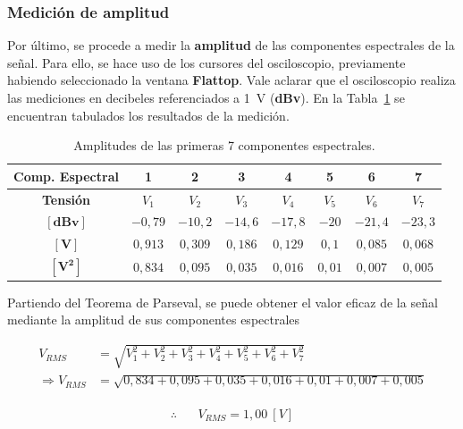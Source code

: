       
    \subsubsection{Medición de amplitud}
      Por último, se procede a medir la \textbf{amplitud} de las componentes espectrales de la señal. Para ello, se hace uso de los cursores
      del osciloscopio, previamente habiendo seleccionado la ventana \textbf{Flattop}. Vale aclarar que el osciloscopio realiza las mediciones
      en decibeles referenciados a 1~V (\textbf{dBv}). En la Tabla~\ref{tab:AmplitudEspectrExp1} se encuentran tabulados los resultados de la medición.

      \begin{table}[H]
        \centering
      \begin{tabular}{cccccccc} \hline \hline
        \textbf{Comp. Espectral}  &  \textbf{1}  &  \textbf{2}  & \textbf{3}  & \textbf{4} & \textbf{5}  & \textbf{6}  &  \textbf{7}\\ \hline
        \textbf{Tensión} &   $V_1$    &   $V_2$     &   $V_3$    &  $V_4$    &  $V_5$  &  $V_6$    &  $V_7$\\ \hline \hline
        $\mathbf{[dBv]}$ &   $-0,79$  &   $-10,2$   &   $-14,6$  &  $-17,8$  &  $-20$  &  $-21,4$  &  $-23,3$\\ \hline
        $\mathbf{[V]}$   &  $0,913$   &   $0,309$   & $0,186$    &  $0,129$  &  $0,1$  &  $0,085$  &  $0,068$ \\ \hline
        $\mathbf{[V^2]}$ &  $0,834$   &   $0,095$   & $0,035$    &  $0,016$  &  $0,01$ &  $0,007$  &  $0,005$ \\ \hline \hline
        \end{tabular}
        \caption{Amplitudes de las primeras 7 componentes espectrales.}
        \label{tab:AmplitudEspectrExp1}
      \end{table}

      Partiendo del Teorema de Parseval, se puede obtener el valor eficaz de la señal mediante la amplitud de sus componentes espectrales

      \begin{align*}
                        V_{RMS} &= \sqrt{V_1^2 + V_2^2 + V_3^2 + V_4^2 + V_5^2 + V_6^2 + V_7^2}  \\
        \Longrightarrow V_{RMS} &= \sqrt{0,834 + 0,095 + 0,035 + 0,016 + 0,01 + 0,007 + 0,005 } \\
      \end{align*}

      \vspace{-25pt}
      $$\therefore \hspace{20pt} \boxed{V_{RMS}=1,00~[V]}$$

